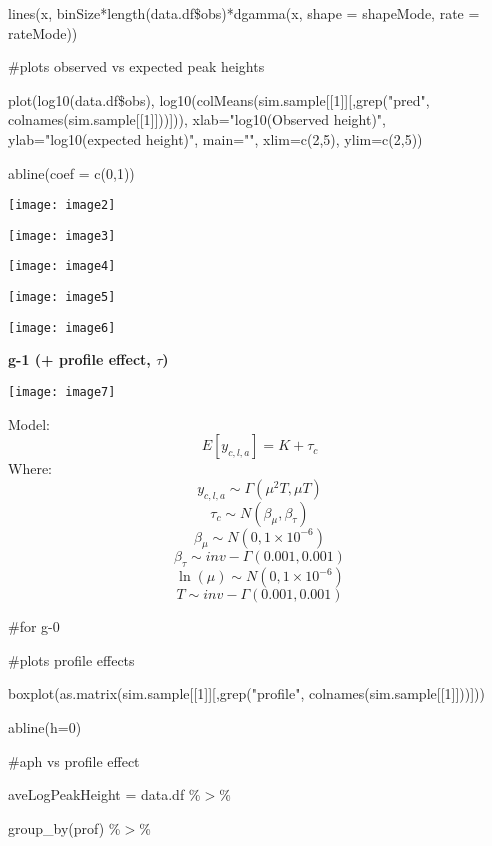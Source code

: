 \documentclass{article} %
\begin{document}
\noindent lines(x, binSize*length(data.df\$obs)*dgamma(x, shape = shapeMode, rate = rateMode))

\noindent 

\noindent \#plots observed vs expected peak heights

\noindent plot(log10(data.df\$obs), log10(colMeans(sim.sample[[1]][,grep("pred", colnames(sim.sample[[1]]))])), xlab="log10(Observed height)", ylab="log10(expected height)", main="", xlim=c(2,5), ylim=c(2,5))

\noindent abline(coef = c(0,1))

\noindent \texttt{[image: image2]}

\noindent \texttt{[image: image3]}

\noindent \texttt{[image: image4]}

\noindent \texttt{[image: image5]}

\noindent \texttt{[image: image6]}

\noindent \eject 

\noindent \textbf{g-1 (+ profile effect, $\tau$)}

\noindent 

\noindent \texttt{[image: image7]}

\noindent Model:
\[E\left[y_{c,l,a} \right]=K+\tau _{c} \] 
Where:
\[y_{c,l,a} \sim \Gamma \left(\mu ^{2} T,\mu T\right)\] 
\[\tau _{c} \sim N\left(\beta _{\mu } ,\beta _{\tau } \right)\] 
\[\beta _{\mu } \sim N(0,1\times 10^{-6} )\] 
\[\beta _{\tau } \sim inv-\Gamma (0.001,0.001)\] 
\[\ln (\mu )\sim N(0,1\times 10^{-6} )\] 
\[T\sim inv-\Gamma (0.001,0.001)\] 


\noindent 

\noindent \#for g-0

\noindent \#plots profile effects

\noindent boxplot(as.matrix(sim.sample[[1]][,grep("profile", colnames(sim.sample[[1]]))]))

\noindent abline(h=0)

\noindent 

\noindent \#aph vs profile effect

\noindent aveLogPeakHeight = data.df \%$\mathrm{>}$\%

\noindent       group\_by(prof) \%$\mathrm{>}$\%
\end{document}

